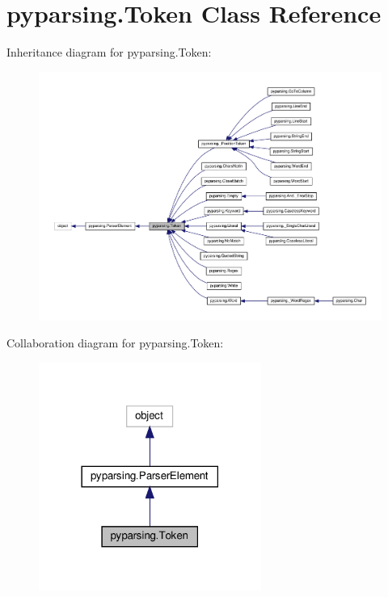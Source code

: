 \hypertarget{classpyparsing_1_1Token}{}\section{pyparsing.\+Token Class Reference}
\label{classpyparsing_1_1Token}


Inheritance diagram for pyparsing.\+Token\+:
\nopagebreak
\begin{figure}[H]
\begin{center}
\leavevmode
\includegraphics[width=350pt]{classpyparsing_1_1Token__inherit__graph}
\end{center}
\end{figure}


Collaboration diagram for pyparsing.\+Token\+:
\nopagebreak
\begin{figure}[H]
\begin{center}
\leavevmode
\includegraphics[width=206pt]{classpyparsing_1_1Token__coll__graph}
\end{center}
\end{figure}
